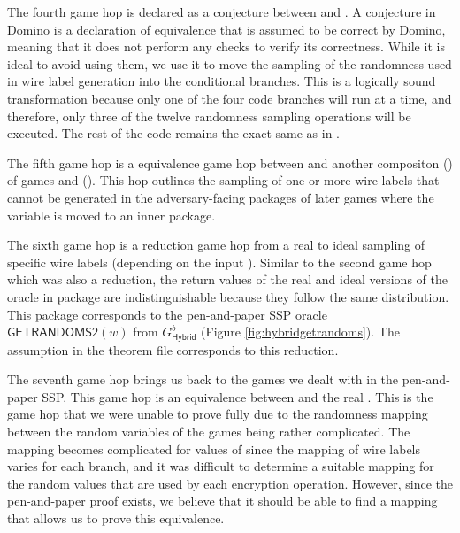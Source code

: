 The fourth game hop is declared as a conjecture between  and . A conjecture in Domino is a declaration of equivalence that is assumed to be correct by Domino, meaning that it does not perform any checks to verify its correctness. While it is ideal to avoid using them, we use it to move the sampling of the randomness used in wire label generation into the conditional branches. This is a logically sound transformation because only one of the four code branches will run at a time, and therefore, only three of the twelve randomness sampling operations will be executed. The rest of the code remains the exact same as in .

The fifth game hop is a equivalence game hop between \break{} and another compositon () of games  and (). This hop outlines the sampling of one or more wire labels that cannot be generated in the adversary-facing packages of later games where the variable  is moved to an inner package. 

The sixth game hop is a reduction game hop from a real to ideal sampling of specific wire labels (depending on the input ). Similar to the second game hop which was also a reduction, the return values of the real and ideal versions of the oracle  in package  are indistinguishable because they follow the same distribution. This package corresponds to the pen-and-paper SSP oracle $\mathsf{GETRANDOMS2\mathit{(w)}}$ from $G^b_\mathsf{Hybrid}$ (Figure \ref{fig:hybridgetrandoms}). The assumption  in the theorem file corresponds to this reduction.

The seventh game hop brings us back to the games we dealt with in the pen-and-paper SSP. This game hop is an equivalence between  and the real . This is the game hop that we were unable to prove fully due to the randomness mapping between the random variables of the games being rather complicated. The mapping becomes complicated for values of  since the mapping of wire labels varies for each branch, and it was difficult to determine a suitable mapping for the random values that are used by each encryption operation. However, since the pen-and-paper proof exists, we believe that it should be able to find a mapping that allows us to prove this equivalence.

